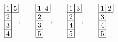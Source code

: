 \[
 \begin{array}[c]{*{2}c}\cline{1-2}
 \lr{1}&\lr{5}\\\cline{1-2}
 \lr{2}\\\cline{1-1}
 \lr{3}\\\cline{1-1}
 \lr{4}\\\cline{1-1}
 \end{array},\hspace{20pt}
 \begin{array}[c]{*{2}c}\cline{1-2}
 \lr{1}&\lr{4}\\\cline{1-2}
 \lr{2}\\\cline{1-1}
 \lr{3}\\\cline{1-1}
 \lr{5}\\\cline{1-1}
 \end{array},\hspace{20pt}
 \begin{array}[c]{*{2}c}\cline{1-2}
 \lr{1}&\lr{3}\\\cline{1-2}
 \lr{2}\\\cline{1-1}
 \lr{4}\\\cline{1-1}
 \lr{5}\\\cline{1-1}
 \end{array},\hspace{20pt}
 \begin{array}[c]{*{2}c}\cline{1-2}
 \lr{1}&\lr{2}\\\cline{1-2}
 \lr{3}\\\cline{1-1}
 \lr{4}\\\cline{1-1}
 \lr{5}\\\cline{1-1}
 \end{array}
 \]

